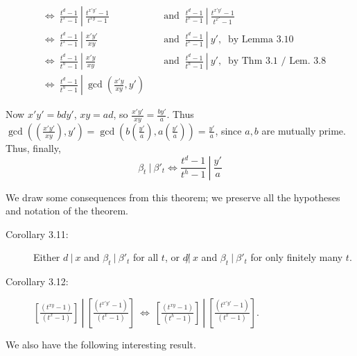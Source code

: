 \begin{description}
    \begin{align*}
    & \Longleftrightarrow\ \frac{t^{d}-1}{t^{x}-1}\ \left|\ \frac{t^{x'y'}-1}{t^{xy}-1} \right. && \text{ and }\ \left. \frac{t^{d}-1}{t^{x}-1}\ \right|\ \frac{t^{x'y'}-1}{t^{x'}-1} \\
    & \Longleftrightarrow\ \frac{t^{d}-1}{t^{x}-1}\ \left|\ \frac{x'y'}{xy}             \right. && \text{ and }\ \left. \frac{t^{d}-1}{t^{x}-1}\ \right|\ y',\ \text{ by Lemma 3.10} \\
    & \Longleftrightarrow\ \frac{t^{d}-1}{t^{h}-1}\ \left|\ \frac{x'y}{xy}              \right. && \text{ and }\ \left. \frac{t^{d}-1}{t^{h}-1}\ \right|\ y',\ \text{ by Thm 3.1 / Lem. 3.8} \\
    & \Longleftrightarrow\ \frac{t^{d}-1}{t^{h}-1}\ \left|\ \gcd \left( \frac{x'y}{xy}, y' \right) \right. 
    \end{align*}

    Now $x' y' = bdy'$, $xy = ad$, so $\frac{x'y'}{xy} = \frac{by'}{a}$. Thus $\gcd \left( \left( \frac{x'y'}{xy} \right), y' \right)  =  \gcd \left( b \left( \frac{y'}{a} \right), a \left( \frac{y'}{a} \right) \right) = \frac{y'}{a}$, since $a,b$ are mutually prime. Thus, finally,
    \begin{equation*}
    \beta_{t}\ |\ \beta'_{t} \Longleftrightarrow \frac{t^{d}-1}{t^{h}-1}\ \left|\ \frac{y'}{a} \right.
    \end{equation*}

\end{description}

We draw some consequences from this theorem; we preserve all the hypotheses and notation of the theorem.

\begin{description}

  \item[Corollary 3.11:] Either $d\ |\ x$ and $\beta_{t}\ |\ \beta'_{t}$ for all $t$, or $d \not|\ x$ and $\beta_{t}\ |\ \beta'_{t}$ for only finitely many $t$.

  \item[Corollary 3.12:] $\left[ \frac{(t^{xy}-1)}{(t^{x}-1)} \right]\ \left|\ \left[ \frac{(t^{x'y'}-1)}{(t^{x}-1)} \right]\ \Longleftrightarrow\ \left[ \frac{(t^{xy}-1)}{(t^{h}-1)} \right]\ \right|\ \left[ \frac{(t^{x'y'}-1)}{(t^{x}-1)} \right]$.

\end{description}

We also have the following interesting result.

